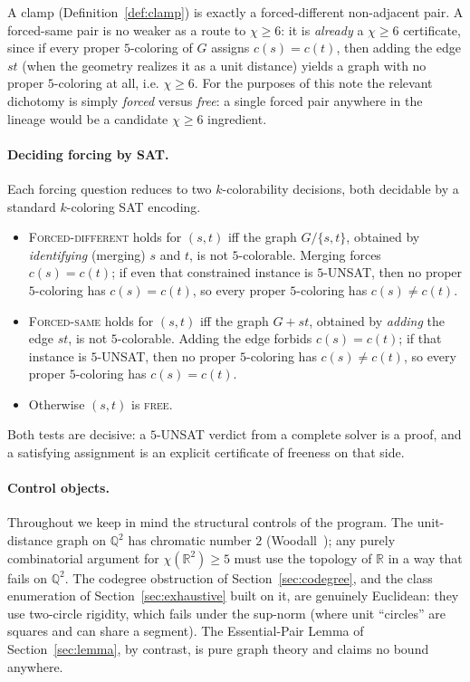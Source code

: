 \documentclass[11pt]{article}
\theoremstyle{definition}
\newcommand{\R}{\mathbb{R}}
\newcommand{\Q}{\mathbb{Q}}
\newcommand{\chrom}{\chi}
\begin{document}
A clamp (Definition~\ref{def:clamp}) is exactly a forced-different non-adjacent
pair. A forced-same pair is no weaker as a route to $\chrom \ge 6$: it is
\emph{already} a $\chrom \ge 6$ certificate, since if every proper $5$-coloring of
$G$ assigns $c(s) = c(t)$, then adding the edge $st$ (when the geometry realizes
it as a unit distance) yields a graph with no proper $5$-coloring at all, i.e.
$\chrom \ge 6$. For the purposes of this note the
relevant dichotomy is simply \emph{forced} versus \emph{free}: a single forced
pair anywhere in the lineage would be a candidate $\chrom \ge 6$ ingredient.

\paragraph{Deciding forcing by SAT.} Each forcing question reduces to two
$k$-colorability decisions, both decidable by a standard $k$-coloring SAT
encoding.
\begin{itemize}
  \item \textsc{Forced-different} holds for $(s,t)$ iff the graph $G / \{s,t\}$,
        obtained by \emph{identifying} (merging) $s$ and $t$, is not
        $5$-colorable. Merging forces $c(s) = c(t)$; if even that constrained
        instance is $5$-UNSAT, then no proper $5$-coloring has $c(s) = c(t)$, so
        every proper $5$-coloring has $c(s) \ne c(t)$.
  \item \textsc{Forced-same} holds for $(s,t)$ iff the graph $G + st$, obtained by
        \emph{adding} the edge $st$, is not $5$-colorable. Adding the edge forbids
        $c(s) = c(t)$; if that instance is $5$-UNSAT, then no proper $5$-coloring
        has $c(s) \ne c(t)$, so every proper $5$-coloring has $c(s) = c(t)$.
  \item Otherwise $(s,t)$ is \textsc{free}.
\end{itemize}
Both tests are decisive: a $5$-UNSAT verdict from a complete solver is a proof,
and a satisfying assignment is an explicit certificate of freeness on that side.

\paragraph{Control objects.} Throughout we keep in mind the structural controls
of the program. The unit-distance graph on $\Q^2$ has chromatic number $2$
(Woodall~\cite{Woodall1973}); any purely combinatorial argument for
$\chrom(\R^2) \ge 5$ must use the topology of $\R$ in a way that fails on $\Q^2$.
The codegree obstruction of Section~\ref{sec:codegree}, and the class
enumeration of Section~\ref{sec:exhaustive} built on it, are genuinely
Euclidean: they use two-circle rigidity, which fails under the sup-norm (where
unit ``circles'' are squares and can share a segment). The Essential-Pair Lemma of
Section~\ref{sec:lemma}, by contrast, is pure graph theory and claims no bound
anywhere.
\end{document}
